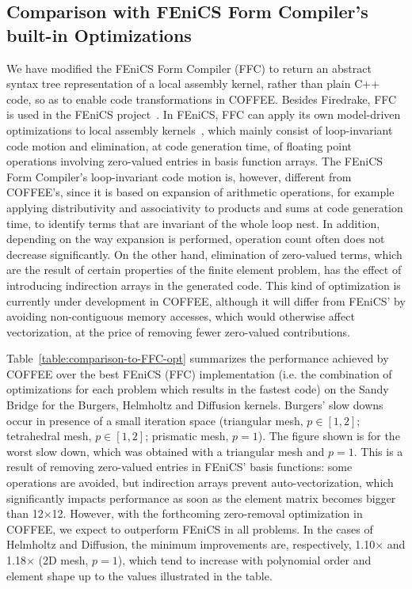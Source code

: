 \documentclass[conference]{IEEEtran}
\begin{document}
\subsection{Comparison with FEniCS Form Compiler's built-in Optimizations}
\label{sec:perf-results-fenics}
We have modified the FEniCS Form Compiler (FFC) to return an abstract syntax tree representation of a local assembly kernel, rather than plain C++ code, so as to enable code transformations in COFFEE. Besides Firedrake, FFC is used in the FEniCS project~\cite{Fenics}. In FEniCS, FFC can apply its own model-driven optimizations to local assembly kernels~\cite{quadrature1}, which mainly consist of loop-invariant code motion and elimination, at code generation time, of floating point operations involving zero-valued entries in basis function arrays. The FEniCS Form Compiler's loop-invariant code motion is, however, different from COFFEE's, since it is based on expansion of arithmetic operations, for example applying distributivity and associativity to products and sums at code generation time, to identify terms that are invariant of the whole loop nest. In addition, depending on the way expansion is performed, operation count often does not decrease significantly. On the other hand, elimination of zero-valued terms, which are the result of certain properties of the finite element problem, has the effect of introducing indirection arrays in the generated code. This kind of optimization is currently under development in COFFEE, although it will differ from FEniCS' by avoiding non-contiguous memory accesses, which would otherwise affect vectorization, at the price of removing fewer zero-valued contributions.

Table~\ref{table:comparison-to-FFC-opt} summarizes the performance achieved by COFFEE over the best FEniCS (FFC) implementation (i.e. the combination of optimizations for each problem which results in the fastest code) on the Sandy Bridge for the Burgers, Helmholtz and Diffusion kernels. Burgers' slow downs occur in presence of a small iteration space (triangular mesh, $p \in [1, 2]$; tetrahedral mesh, $p \in [1, 2]$; prismatic mesh, $p = 1$). The figure shown is for the worst slow down, which was obtained with a triangular mesh and $p = 1$. This is a result of removing zero-valued entries in FEniCS' basis functions: some operations are avoided, but indirection arrays prevent auto-vectorization, which significantly impacts performance as soon as the element matrix becomes bigger than 12$\times$12. However, with the forthcoming zero-removal optimization in COFFEE, we expect to outperform FEniCS in all problems. In the cases of Helmholtz and Diffusion, the minimum improvements are, respectively, 1.10$\times$ and 1.18$\times$ (2D mesh, $p=1$), which tend to increase with polynomial order and element shape up to the values illustrated in the table.
\end{document}
